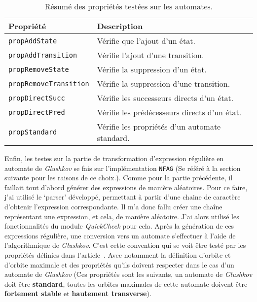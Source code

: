 \begin{table}[H]
    \centering
    \begin{tabular}{ll}
        \toprule
        \textbf{Propriété}                         & \textbf{Description}                           \\
        \midrule
        \texttt{propAddState}         & Vérifie que l'ajout d'un état.                 \\
        \texttt{propAddTransition}    & Vérifie l'ajout d'une transition.              \\
        \texttt{propRemoveState}      & Vérifie la suppression d'un état.              \\
        \texttt{propRemoveTransition} & Vérifie la suppression d'une transition.       \\
        \texttt{propDirectSucc}       & Vérifie les successeurs directs d'un état.     \\
        \texttt{propDirectPred}       & Vérifie les prédécesseurs directs d'un état.   \\
        \texttt{propStandard}         & Vérifie les propriétés d'un automate standard. \\
        \bottomrule
    \end{tabular}
    \caption{Résumé des propriétés testées sur les automates.}\label{tab:proprietes}
\end{table}

\vphantom{}

Enfin, les testes sur la partie de transformation d'expression régulière en
automate de \textit{Glushkov} se fais sur l'implémentation
\texttt{NFAG} (Se référé à la section suivante pour les raisons de
ce choix.). Comme pour la partie précédente, il faillait tout d'abord générer
des expressions de manière aléatoires. Pour ce faire, j'ai utilisé le `parser'
développé, permettant à partir d'une chaine de caractère d'obtenir l'expression
correspondante. Il m'a donc fallu créer une chaîne représentant une expression,
et cela, de manière aléatoire. J'ai alors utilisé les fonctionnalités du module
\textit{QuickCheck} pour cela. Après la génération de ces expressions régulière,
une conversion vers un automate s'effectuer à l'aide de l'algorithmique de
\textit{Glushkov}. C'est cette convention qui se voit être testé par les
propriétés définies dans l'article~\cite{CaronZiadi2001}. Avec notamment la
définition d'orbite et d'orbite maximale et des propriétés qu'ils doivent
respecter dans le cas d'un automate de \textit{Glushkov} (Ces propriétés sont
les suivants, un automate de \textit{Glushkov} doit être \textbf{standard},
toutes les orbites maximales de cette automate doivent être
\textbf{fortement stable} et \textbf{hautement transverse}).

